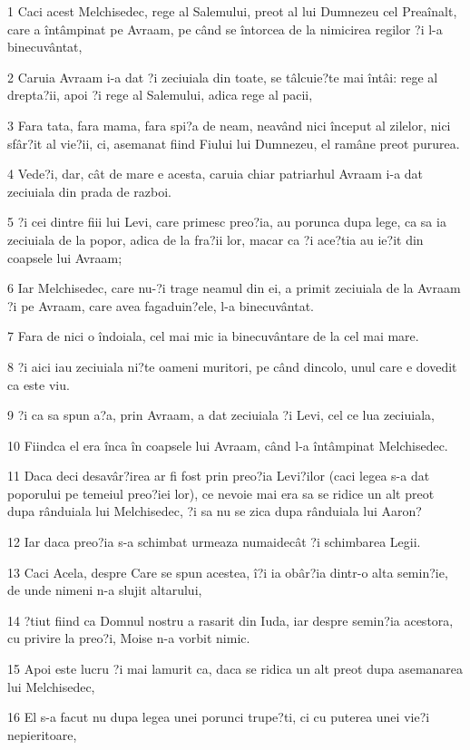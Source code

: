 \par 1 Caci acest Melchisedec, rege al Salemului, preot al lui Dumnezeu cel Preaînalt, care a întâmpinat pe Avraam, pe când se întorcea de la nimicirea regilor ?i l-a binecuvântat,
\par 2 Caruia Avraam i-a dat ?i zeciuiala din toate, se tâlcuie?te mai întâi: rege al drepta?ii, apoi ?i rege al Salemului, adica rege al pacii,
\par 3 Fara tata, fara mama, fara spi?a de neam, neavând nici început al zilelor, nici sfâr?it al vie?ii, ci, asemanat fiind Fiului lui Dumnezeu, el ramâne preot pururea.
\par 4 Vede?i, dar, cât de mare e acesta, caruia chiar patriarhul Avraam i-a dat zeciuiala din prada de razboi.
\par 5 ?i cei dintre fiii lui Levi, care primesc preo?ia, au porunca dupa lege, ca sa ia zeciuiala de la popor, adica de la fra?ii lor, macar ca ?i ace?tia au ie?it din coapsele lui Avraam;
\par 6 Iar Melchisedec, care nu-?i trage neamul din ei, a primit zeciuiala de la Avraam ?i pe Avraam, care avea fagaduin?ele, l-a binecuvântat.
\par 7 Fara de nici o îndoiala, cel mai mic ia binecuvântare de la cel mai mare.
\par 8 ?i aici iau zeciuiala ni?te oameni muritori, pe când dincolo, unul care e dovedit ca este viu.
\par 9 ?i ca sa spun a?a, prin Avraam, a dat zeciuiala ?i Levi, cel ce lua zeciuiala,
\par 10 Fiindca el era înca în coapsele lui Avraam, când l-a întâmpinat Melchisedec.
\par 11 Daca deci desavâr?irea ar fi fost prin preo?ia Levi?ilor (caci legea s-a dat poporului pe temeiul preo?iei lor), ce nevoie mai era sa se ridice un alt preot dupa rânduiala lui Melchisedec, ?i sa nu se zica dupa rânduiala lui Aaron?
\par 12 Iar daca preo?ia s-a schimbat urmeaza numaidecât ?i schimbarea Legii.
\par 13 Caci Acela, despre Care se spun acestea, î?i ia obâr?ia dintr-o alta semin?ie, de unde nimeni n-a slujit altarului,
\par 14 ?tiut fiind ca Domnul nostru a rasarit din Iuda, iar despre semin?ia acestora, cu privire la preo?i, Moise n-a vorbit nimic.
\par 15 Apoi este lucru ?i mai lamurit ca, daca se ridica un alt preot dupa asemanarea lui Melchisedec,
\par 16 El s-a facut nu dupa legea unei porunci trupe?ti, ci cu puterea unei vie?i nepieritoare,
